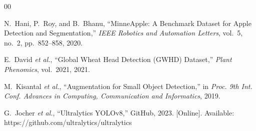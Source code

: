 \documentclass[conference]{IEEEtran}
\begin{document}
\begin{thebibliography}{00}

N.~Hani, P.~Roy, and B.~Bhanu,
``MinneApple: A Benchmark Dataset for Apple Detection
and Segmentation,''
\textit{IEEE Robotics and Automation Letters},
vol.~5, no.~2, pp.~852--858, 2020.

E.~David \textit{et al.},
``Global Wheat Head Detection (GWHD) Dataset,''
\textit{Plant Phenomics}, vol.~2021, 2021.

M.~Kisantal \textit{et al.},
``Augmentation for Small Object Detection,''
in \textit{Proc. 9th Int. Conf. Advances in Computing,
Communication and Informatics}, 2019.

G.~Jocher \textit{et al.},
``Ultralytics YOLOv8,''
GitHub, 2023. [Online].
Available: https://github.com/ultralytics/ultralytics


\end{thebibliography}
\end{document}
